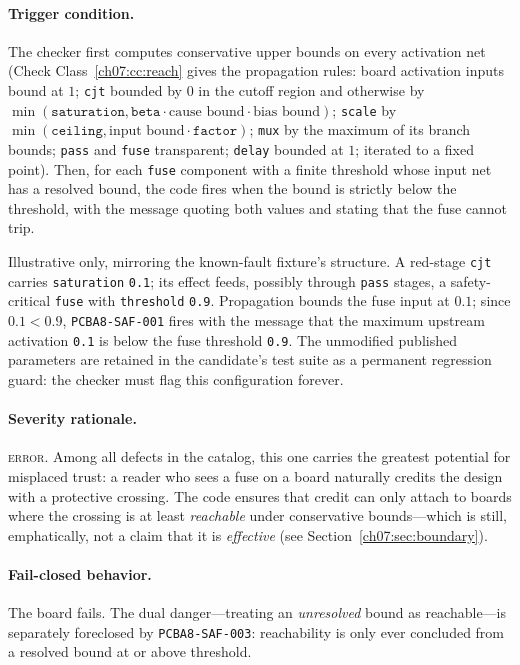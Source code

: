 \paragraph{Trigger condition.} The checker first computes conservative upper bounds on every activation net (Check Class~\ref{ch07:cc:reach} gives the propagation rules: board activation inputs bound at $1$; \texttt{cjt} bounded by $0$ in the cutoff region and otherwise by $\min(\texttt{saturation}, \texttt{beta} \cdot \text{cause bound} \cdot \text{bias bound})$; \texttt{scale} by $\min(\texttt{ceiling}, \text{input bound} \cdot \texttt{factor})$; \texttt{mux} by the maximum of its branch bounds; \texttt{pass} and \texttt{fuse} transparent; \texttt{delay} bounded at $1$; iterated to a fixed point). Then, for each \texttt{fuse} component with a finite threshold whose input net has a resolved bound, the code fires when the bound is strictly below the threshold, with the message quoting both values and stating that the fuse cannot trip.

\begin{example}\label{ch07:ex:saf001}
Illustrative only, mirroring the known-fault fixture's structure. A red-stage \texttt{cjt} carries \texttt{saturation} \texttt{0.1}; its effect feeds, possibly through \texttt{pass} stages, a safety-critical \texttt{fuse} with \texttt{threshold} \texttt{0.9}. Propagation bounds the fuse input at $0.1$; since $0.1 < 0.9$, \texttt{PCBA8-SAF-001} fires with the message that the maximum upstream activation \texttt{0.1} is below the fuse threshold \texttt{0.9}. The unmodified published parameters are retained in the candidate's test suite as a permanent regression guard: the checker must flag this configuration forever.
\end{example}

\paragraph{Severity rationale.} \textsc{error}. Among all defects in the catalog, this one carries the greatest potential for misplaced trust: a reader who sees a fuse on a board naturally credits the design with a protective crossing. The code ensures that credit can only attach to boards where the crossing is at least \emph{reachable} under conservative bounds---which is still, emphatically, not a claim that it is \emph{effective} (see Section~\ref{ch07:sec:boundary}).

\paragraph{Fail-closed behavior.} The board fails. The dual danger---treating an \emph{unresolved} bound as reachable---is separately foreclosed by \texttt{PCBA8-SAF-003}: reachability is only ever concluded from a resolved bound at or above threshold.

